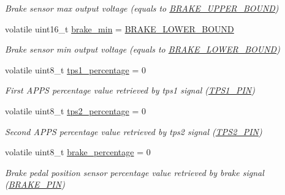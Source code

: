 \begin{DoxyCompactItemize}
\begin{DoxyCompactList}\small\item\em Brake sensor max output voltage (equals to \mbox{\hyperlink{group___board__model__group_ga891de03ab9e1bd9a92ffffe69a1b10ca}{B\+R\+A\+K\+E\+\_\+\+U\+P\+P\+E\+R\+\_\+\+B\+O\+U\+ND}}) \end{DoxyCompactList}\item 
\mbox{\label{group___board__model__group_ga779ee9b904930e3cfb165e70edfecd02}} 
volatile uint16\+\_\+t \mbox{\hyperlink{group___board__model__group_ga779ee9b904930e3cfb165e70edfecd02}{brake\+\_\+min}} = \mbox{\hyperlink{group___board__model__group_ga0aed20cafcc206360abda47b125432c7}{B\+R\+A\+K\+E\+\_\+\+L\+O\+W\+E\+R\+\_\+\+B\+O\+U\+ND}}
\begin{DoxyCompactList}\small\item\em Brake sensor min output voltage (equals to \mbox{\hyperlink{group___board__model__group_ga0aed20cafcc206360abda47b125432c7}{B\+R\+A\+K\+E\+\_\+\+L\+O\+W\+E\+R\+\_\+\+B\+O\+U\+ND}}) \end{DoxyCompactList}\item 
volatile uint8\+\_\+t \mbox{\hyperlink{group___board__model__group_ga1d42f28ccf027a3243fad064fa47ef81}{tps1\+\_\+percentage}} = 0
\begin{DoxyCompactList}\small\item\em First A\+P\+PS percentage value retrieved by tps1 signal (\mbox{\hyperlink{group___board__pinout__group_gae9aa914854f611488701c96a330b0bd4}{T\+P\+S1\+\_\+\+P\+IN}}) \end{DoxyCompactList}\item 
volatile uint8\+\_\+t \mbox{\hyperlink{group___board__model__group_gaf69d82f83885abc5adbd5fcbf4c421cf}{tps2\+\_\+percentage}} = 0
\begin{DoxyCompactList}\small\item\em Second A\+P\+PS percentage value retrieved by tps2 signal (\mbox{\hyperlink{group___board__pinout__group_gab13a816bae3ca994897fc6f1cb590a67}{T\+P\+S2\+\_\+\+P\+IN}}) \end{DoxyCompactList}\item 
volatile uint8\+\_\+t \mbox{\hyperlink{group___board__model__group_ga8e50a30864da7026531520887968d4c0}{brake\+\_\+percentage}} = 0
\begin{DoxyCompactList}\small\item\em Brake pedal position sensor percentage value retrieved by brake signal (\mbox{\hyperlink{group___board__pinout__group_gad632b56bf4c6259a390c3db91607078e}{B\+R\+A\+K\+E\+\_\+\+P\+IN}}) \end{DoxyCompactList}\item 

\end{DoxyCompactItemize}
